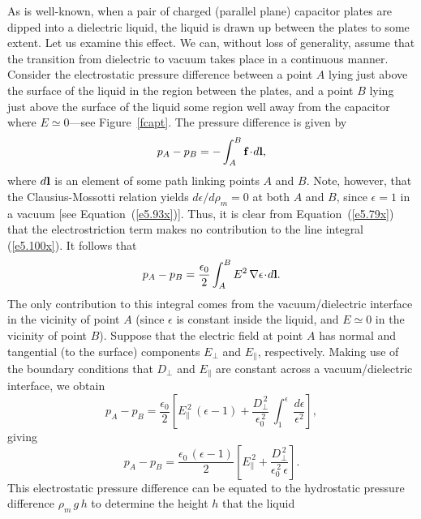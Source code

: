 As is well-known, when a pair of charged (parallel plane) capacitor plates are dipped into
a dielectric liquid, the liquid is drawn up between the plates to
some extent. Let us examine this effect. We can, without loss of
generality, assume that the transition from dielectric to vacuum takes
place in a continuous manner. Consider the electrostatic
pressure difference
between a point $A$ lying just above the surface of the liquid in the region between the
plates, and a point $B$ lying just above the surface of the liquid some region well
away from the capacitor where $E\simeq 0$---see Figure~\ref{fcapt}. The pressure difference is
given by
\begin{equation}\label{e5.100x}
p_A - p_B = -\int_A^B {\bf f}\!\cdot\!d{\bf l},
\end{equation}
where $d{\bf l}$ is an element of some path linking points $A$ and $B$.
Note, however, that the Clausius-Mossotti
relation yields $d\epsilon/d\rho_m=0$ at both $A$ and $B$,  since $\epsilon=1$
in a vacuum [see Equation~(\ref{e5.93x})]. Thus, it is clear from Equation~(\ref{e5.79x})
that the electrostriction term makes no contribution to the   line
integral (\ref{e5.100x}). It follows that
\begin{equation}\label{e5.101x}
p_A - p_B = \frac{\epsilon_0}{2}\int_A^B E^2\, \nabla\epsilon\!\cdot\!d{\bf l}.
\end{equation}
The only contribution to this integral comes from the vacuum/dielectric
interface in the vicinity of point $A$ (since $\epsilon$ is 
constant inside the
liquid, and $E\simeq 0$ in the vicinity of
 point $B$). Suppose that the electric field
at point $A$ has normal and tangential (to the surface) components
$E_\perp$ and $E_\parallel$, respectively. Making use of the
boundary conditions that $D_\perp$ and $E_\parallel$ are constant across
a vacuum/dielectric interface, we obtain
\begin{equation}
p_A - p_B = \frac{\epsilon_0}{2}\left[ E_\parallel^{\,2} \,(\epsilon -1)
+ \frac{D_\perp^{\,2}}{\epsilon_0^{\,2}}\, \int_1^\epsilon\, \frac{d\epsilon}{\epsilon^2}\right],
\end{equation}
giving
\begin{equation}\label{e5.103x}
p_A - p_B = \frac{\epsilon_0\,(\epsilon-1)}{2} \left[E_\parallel^{\,2} +\frac{D_\perp^{\,2}}{\epsilon_0^{\,2}\,\epsilon}\right].
\end{equation}
This electrostatic
pressure difference can be equated to the hydrostatic pressure
difference $\rho_m\, g\, h$ to determine the height $h$ that the liquid
